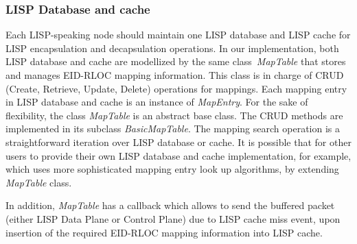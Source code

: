 \subsubsection{LISP Database and cache}
\label{subsec:database-impl}
Each LISP-speaking node should maintain one LISP database and LISP cache for LISP encapsulation and decapsulation operations. In our implementation, both LISP database and cache are modellized by the same class~\emph{MapTable} that stores and manages EID-RLOC mapping information. This class is in charge of CRUD (Create, Retrieve, Update, Delete) operations for mappings. Each mapping entry in LISP database and cache is an instance of \emph{MapEntry}. For the sake of flexibility, the class \emph{MapTable} is an abstract base class. The CRUD methods are implemented in its subclass \emph{BasicMapTable}. The mapping search operation is a straightforward iteration over LISP database or cache. It is possible that for other users to provide their own LISP database and cache implementation, for example, which uses more sophisticated mapping entry look up algorithms, by extending \emph{MapTable} class.

In addition, \emph{MapTable} has a callback which allows to send the buffered packet (either LISP Data Plane or Control Plane) due to LISP cache miss event, upon insertion of the required EID-RLOC mapping information into LISP cache.

